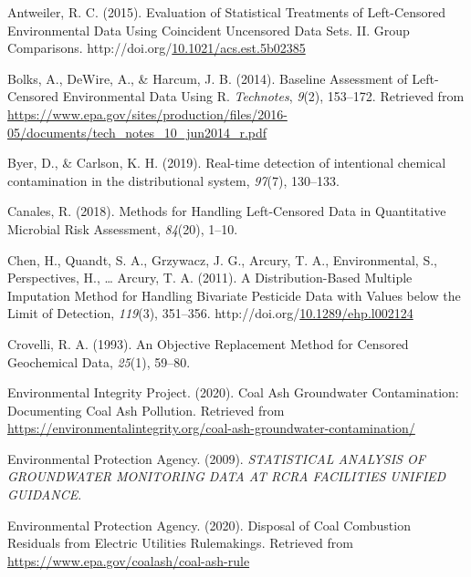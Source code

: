 \documentclass[12pt, twoside]{amherstthesis}
\newenvironment{CSLReferences}%
  {}%
  {\par}
\begin{document}
\hypertarget{refs}{}
\begin{CSLReferences}{1}{0}
\leavevmode\hypertarget{ref-Antweiler2015}{}%
Antweiler, R. C. (2015). {Evaluation of Statistical Treatments of Left-Censored Environmental Data Using Coincident Uncensored Data Sets. II. Group Comparisons}. http://doi.org/\href{https://doi.org/10.1021/acs.est.5b02385}{10.1021/acs.est.5b02385}

\leavevmode\hypertarget{ref-Bolks2014}{}%
Bolks, A., DeWire, A., \& Harcum, J. B. (2014). {Baseline Assessment of Left-Censored Environmental Data Using R}. \emph{Technotes}, \emph{9}(2), 153--172. Retrieved from \url{https://www.epa.gov/sites/production/files/2016-05/documents/tech_notes_10_jun2014_r.pdf}

\leavevmode\hypertarget{ref-Byer2019}{}%
Byer, D., \& Carlson, K. H. (2019). {Real-time detection of intentional chemical contamination in the distributional system}, \emph{97}(7), 130--133.

\leavevmode\hypertarget{ref-Canales2018}{}%
Canales, R. (2018). {Methods for Handling Left-Censored Data in Quantitative Microbial Risk Assessment}, \emph{84}(20), 1--10.

\leavevmode\hypertarget{ref-Chen2011}{}%
Chen, H., Quandt, S. A., Grzywacz, J. G., Arcury, T. A., Environmental, S., Perspectives, H., \ldots{} Arcury, T. A. (2011). {A Distribution-Based Multiple Imputation Method for Handling Bivariate Pesticide Data with Values below the Limit of Detection}, \emph{119}(3), 351--356. http://doi.org/\href{https://doi.org/10.1289/ehp.l002124}{10.1289/ehp.l002124}

\leavevmode\hypertarget{ref-Crovelli1993}{}%
Crovelli, R. A. (1993). {An Objective Replacement Method for Censored Geochemical Data}, \emph{25}(1), 59--80.

\leavevmode\hypertarget{ref-EIP2020}{}%
Environmental Integrity Project. (2020). {Coal Ash Groundwater Contamination: Documenting Coal Ash Pollution}. Retrieved from \url{https://environmentalintegrity.org/coal-ash-groundwater-contamination/}

\leavevmode\hypertarget{ref-EPA2009}{}%
Environmental Protection Agency. (2009). \emph{{STATISTICAL ANALYSIS OF GROUNDWATER MONITORING DATA AT RCRA FACILITIES UNIFIED GUIDANCE}}.

\leavevmode\hypertarget{ref-Car2020}{}%
Environmental Protection Agency. (2020). {Disposal of Coal Combustion Residuals from Electric Utilities Rulemakings}. Retrieved from \url{https://www.epa.gov/coalash/coal-ash-rule}


\end{CSLReferences}
\end{document}
